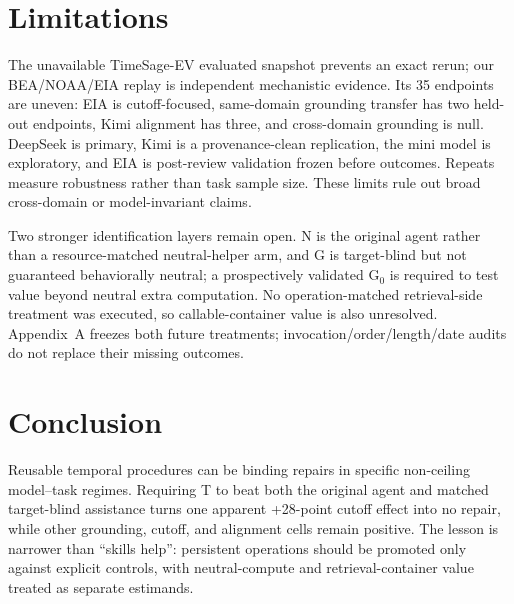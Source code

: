 \section{Limitations}
\label{sec:limitations}
The unavailable TimeSage-EV evaluated snapshot prevents an exact rerun; our BEA/NOAA/EIA replay is independent mechanistic evidence. Its 35 endpoints are uneven: EIA is cutoff-focused, same-domain grounding transfer has two held-out endpoints, Kimi alignment has three, and cross-domain grounding is null. DeepSeek is primary, Kimi is a provenance-clean replication, the mini model is exploratory, and EIA is post-review validation frozen before outcomes. Repeats measure robustness rather than task sample size. These limits rule out broad cross-domain or model-invariant claims.

Two stronger identification layers remain open. N is the original agent rather than a resource-matched neutral-helper arm, and G is target-blind but not guaranteed behaviorally neutral; a prospectively validated G$_0$ is required to test value beyond neutral extra computation. No operation-matched retrieval-side treatment was executed, so callable-container value is also unresolved. Appendix~A freezes both future treatments; invocation/order/length/date audits do not replace their missing outcomes.

\section{Conclusion}
Reusable temporal procedures can be binding repairs in specific non-ceiling model--task regimes. Requiring T to beat both the original agent and matched target-blind assistance turns one apparent +28-point cutoff effect into no repair, while other grounding, cutoff, and alignment cells remain positive. The lesson is narrower than ``skills help'': persistent operations should be promoted only against explicit controls, with neutral-compute and retrieval-container value treated as separate estimands.
